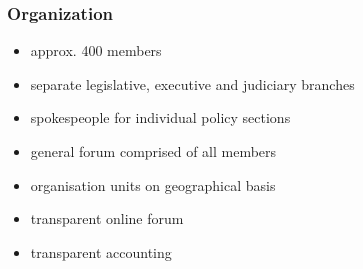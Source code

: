 \begin{frame}
	\frametitle{Organization}
	\begin{itemize}
		\item approx. 400 members
		\item separate legislative, executive and judiciary branches
		\item spokespeople for individual policy sections
		\item general forum comprised of all members
		\item organisation units on geographical basis
		\item transparent online forum
		\item transparent accounting
	\end{itemize}
	
	

\end{frame}
